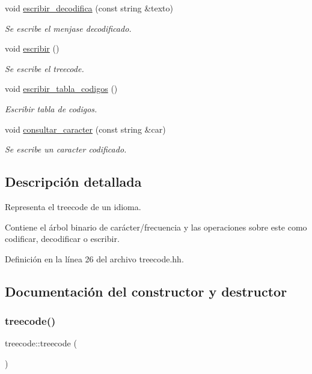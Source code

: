 \begin{DoxyCompactItemize}
$$void \hyperlink{classtreecode_aa009979ff4cb55efdf3a73c969e71291}{escribir\+\_\+decodifica} (const string \&texto)
\begin{DoxyCompactList}\small\item\em Se escribe el menjase decodificado. \end{DoxyCompactList}\item 
void \hyperlink{classtreecode_a1b4221231711dc52751ddca683f146b1}{escribir} ()
\begin{DoxyCompactList}\small\item\em Se escribe el treecode. \end{DoxyCompactList}\item 
void \hyperlink{classtreecode_ad56be1d26c0f852511b8ca0ce3f42cd3}{escribir\+\_\+tabla\+\_\+codigos} ()
\begin{DoxyCompactList}\small\item\em Escribir tabla de codigos. \end{DoxyCompactList}\item 
void \hyperlink{classtreecode_a83f608796a2a3fbbbe903bbb7e0448c3}{consultar\+\_\+caracter} (const string \&car)
\begin{DoxyCompactList}\small\item\em Se escribe un caracter codificado. \end{DoxyCompactList}\end{DoxyCompactItemize}


\subsection{Descripción detallada}
Representa el treecode de un idioma. 

Contiene el árbol binario de carácter/frecuencia y las operaciones sobre este como codificar, decodificar o escribir. 

Definición en la línea 26 del archivo treecode.\+hh.



\subsection{Documentación del constructor y destructor}
\mbox{\label{classtreecode_a221f560d05368b0fd98593cd42a15e33}} 
\subsubsection{\texorpdfstring{treecode()}{treecode()}}
{\footnotesize\ttfamily treecode\+::treecode (\begin{DoxyParamCaption}{ }\end{DoxyParamCaption})}



